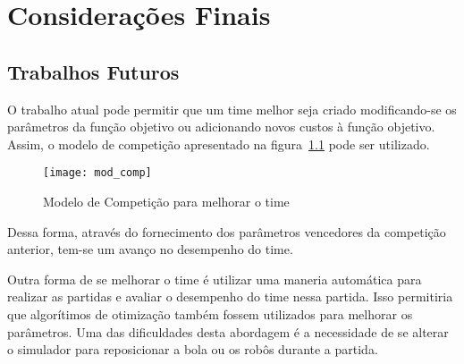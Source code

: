\chapter{Considerações Finais}\label{cap:cons_finais}

\section{Trabalhos Futuros}

O trabalho atual pode permitir que um time melhor
seja criado modificando-se os parâmetros da função
objetivo ou adicionando novos custos à função objetivo.
Assim, o modelo de competição apresentado na
figura~\ref{fig:mod_comp} pode ser utilizado.

\begin{figure}[H]
  \centering
  \texttt{[image: mod\_comp]}
  \caption{Modelo de Competição para melhorar
           o time}\label{fig:mod_comp}
\end{figure}

Dessa forma, através do fornecimento dos parâmetros
vencedores da competição anterior, tem-se um avanço
no desempenho do time.

Outra forma de se melhorar o time é utilizar uma
maneria automática para realizar as partidas e
avaliar o desempenho do time nessa partida. Isso
permitiria que algorítimos de otimização também
fossem utilizados para melhorar os parâmetros.
Uma das dificuldades desta abordagem é a necessidade
de se alterar o simulador para reposicionar a bola
ou os robôs durante a partida.
 
%



